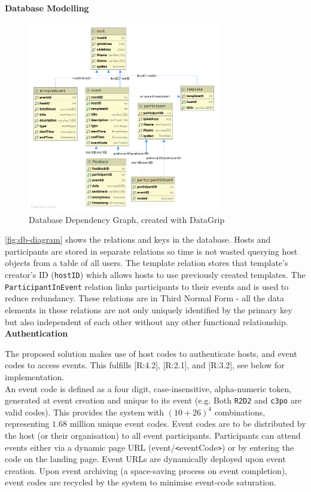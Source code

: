 \documentclass[9pt, titlepage]{extarticle}
\begin{document}
\textbf{Database Modelling}

\begin{figure}[h]
\centering
\includegraphics[width=0.75\textwidth]{assets/db.png}
\caption{Database Dependency Graph, created with DataGrip \autocite{dg}}
\label{fig:db-diagram}
\end{figure}

\autoref{fig:db-diagram} shows the relations and keys in the database. Hosts and participants are stored in separate relations so time is not wasted querying host objects from a table of all users. The template relation stores that template's creator's ID (\texttt{hostID}) which allows hosts to use previously created templates. The \texttt{ParticipantInEvent} relation links participants to their events and is used to reduce redundancy. These relations are in Third Normal Form - all the data elements in these relations are not only uniquely identified by the primary key but also independent of each other without any other functional relationship.\\

\textbf{Authentication} \label{auth}

The proposed solution makes use of host codes to authenticate hosts, and event codes to access events. This fulfills [R:4.2], [R:2.1], and [R:3.2], see below for implementation.\\

An event code is defined as a four digit, case-insensitive, alpha-numeric token, generated at event creation and unique to its event 
(e.g. Both \texttt{R2D2} and \texttt{c3po} are valid codes).
This provides the system with $(10+26)^4$ combinations, representing $1.68$ million unique event codes.
Event codes are to be distributed by the host (or their organisation) to all event participants. 
Participants can attend events either via a dynamic page URL (event/\texttt{<}eventCode\texttt{>}) or by entering the code on the landing page. Event URLs are dynamically deployed upon event creation.
Upon event archiving (a space-saving process on event completion), event codes are recycled by the system to minimise event-code saturation.\\
\end{document}
